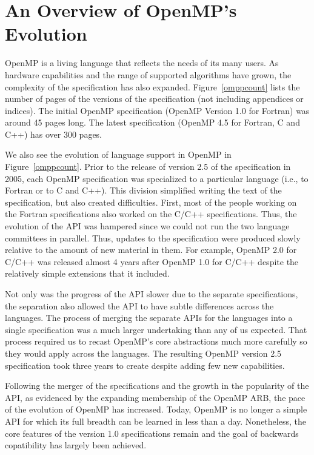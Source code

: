 \section{An Overview of OpenMP's Evolution}
\label{sec:evolve}

OpenMP is a living language that reflects the needs of its many users. 
As hardware capabilities and the range of supported algorithms have 
grown, the complexity of the specification has also expanded. 
Figure~\ref{omppcount} lists the number of pages of the 
versions of the specification (not including appendices or indices).   
The initial OpenMP specification (OpenMP Version 1.0 for Fortran) was 
around 45 pages long. The  latest specification (OpenMP 4.5 for Fortran, 
C and C++)  has over 300 pages.

We also see the evolution of language support in OpenMP in
Figure~\ref{omppcount}. Prior to the release of version 2.5 of the 
specification in 2005, each OpenMP specification was specialized to 
a particular language (i.e., to Fortran or to C and C++). This division
simplified writing the text of the specification, but also created 
difficulties. First, most of the people working on the Fortran 
specifications also worked on the C/C++ specifications. Thus, the 
evolution of the API was hampered since we could not run the two 
language committees in parallel. Thus, updates to the specification 
were produced slowly relative to the amount of new material in them.
For example, OpenMP 2.0 for C/C++ was released almost 4 years after 
OpenMP 1.0 for C/C++ despite the relatively simple extensions that it
included. 

Not only was the progress of the API slower due to the separate 
specifications, the separation also allowed the API to have subtle 
differences across the languages. The process of merging the separate
APIs for the languages into a single  specification was a much larger 
undertaking than any of us expected. That process required us to recast 
OpenMP's core abstractions much more carefully so they would apply across 
the languages. The resulting OpenMP version 2.5 specification took
three years to create despite adding few new capabilities.

Following the merger of the specifications and the growth in the popularity
of the API, as evidenced by the expanding membership of the OpenMP ARB,
the pace of the evolution of OpenMP has increased. Today, OpenMP is no 
longer a simple API for which its full breadth can be learned in less 
than a day. Nonetheless, the core features of the version 1.0 specifications
remain and the goal of backwards copatibility has largely been achieved.

